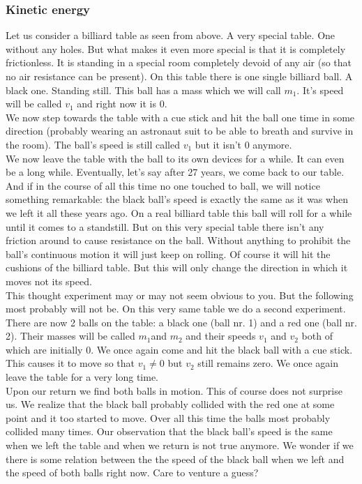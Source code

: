 \subsubsection{Kinetic energy}

\noindent Let us consider a billiard table as seen from above. A very special table. One without any holes. But what makes it even more special is that it is completely frictionless. It is standing in a special room completely devoid of any air (so that no air resistance can be present). On this table there is one single billiard ball. A black one. Standing still. This ball has a mass which we will call $m_1$. It's speed will be called $v_1$ and right now it is 0.\\

\noindent We now step towards the table with a cue stick and hit the ball one time in some direction (probably wearing an astronaut suit to be able to breath and survive in the room). The ball's speed is still called $v_1$ but it isn't 0 anymore.\\

\noindent We now leave the table with the ball to its own devices for a while. It can even be a long while. Eventually, let's say after 27 years, we come back to our table. And if in the course of all this time no one touched to ball, we will notice something remarkable: the black ball's speed is exactly the same as it was when we left it all these years ago. On a real billiard table this ball will roll for a while until it comes to a standstill. But on this very special table there isn't any friction around to cause resistance on the ball. Without anything to prohibit the ball's continuous motion it will just keep on rolling. Of course it will hit the cushions of the billiard table. But this will only change the direction in which it moves not its speed.\\

\noindent This thought experiment may or may not seem obvious to you. But the following most probably will not be. On this very same table we do a second experiment. There are now 2 balls on the table: a black one (ball nr. 1) and a red one (ball nr. 2). Their masses will be called $m_1$and $m_2$ and their speeds $v_1$ and $v_2$ both of which are initially 0. We once again come and hit the black ball with a cue stick. This causes it to move so that $v_1 \neq 0$ but $v_2$ still remains zero. We once again leave the table for a very long time.\\

\noindent Upon our return we find both balls in motion. This of course does not surprise us. We realize that the black ball probably collided with the red one at some point and it too started to move. Over all this time the balls most probably collided many times. Our observation that the black ball's speed is the same when we left the table and when we return is not true anymore. We wonder if we there is some relation between the the speed of the black ball when we left and the speed of both balls right now. Care to venture a guess?\\

